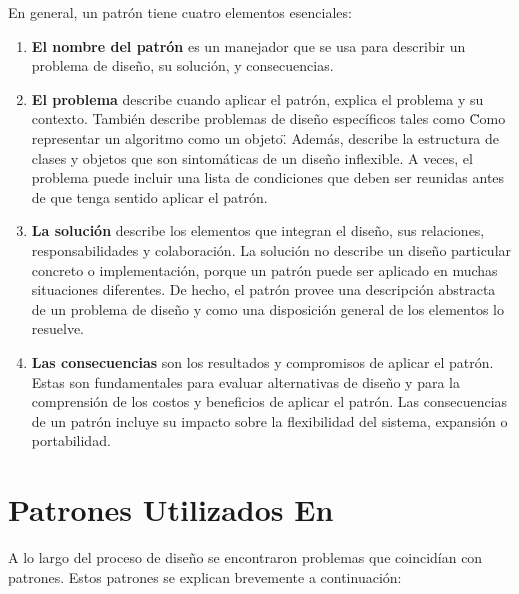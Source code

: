 		En general, un patr\'on tiene cuatro elementos esenciales:
		\begin{enumerate}
			\item \textbf{El nombre del patr\'on} es un manejador que se usa para describir un problema de dise\~no, su soluci\'on, y consecuencias.
			\item \textbf{El problema} describe cuando aplicar el patr\'on, explica el problema y su contexto. Tambi\'en describe problemas de dise\~no 
			espec\'ificos tales como \"Como representar un algoritmo como un objeto\". Adem\'as, describe la estructura de clases y objetos que son sintom\'aticas 
			de un dise\~no inflexible. A veces, el problema puede incluir una lista de condiciones que deben ser reunidas antes de que tenga sentido aplicar el 
			patr\'on.
			\item \textbf{La soluci\'on} describe los elementos que integran el dise\~no, sus relaciones, responsabilidades y colaboraci\'on. La soluci\'on no 
			describe un dise\~no particular concreto o implementaci\'on, porque un patr\'on puede ser aplicado en muchas situaciones diferentes. De hecho, el 
			patr\'on provee una descripci\'on abstracta de un problema de dise\~no y como una disposici\'on general de los elementos lo resuelve.  
			\item \textbf{Las consecuencias} son los resultados y compromisos de aplicar el patr\'on. Estas son fundamentales para evaluar alternativas de dise\~no 
			y para la comprensi\'on de los costos y beneficios de aplicar el patr\'on. Las consecuencias de un patr\'on incluye su impacto sobre la flexibilidad 
			del sistema, expansi\'on o portabilidad.
		\end{enumerate} 

	\section{Patrones Utilizados En \combeng}
		A lo largo del proceso de dise\~no se encontraron problemas que coincid\'ian con patrones. Estos patrones se explican brevemente a continuaci\'on: 
		
